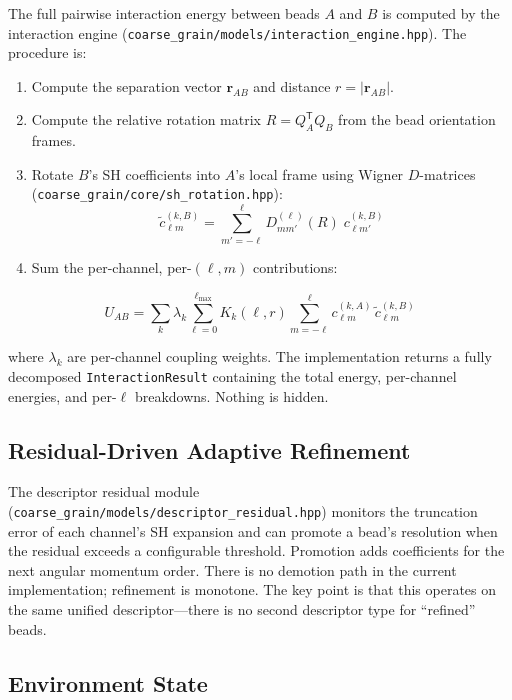 ﻿\documentclass[11pt]{article}
\newcommand{\file}[1]{\texttt{#1}}
\newcommand{\type}[1]{\texttt{#1}}
\begin{document}
The full pairwise interaction energy between beads $A$ and $B$ is computed by
the interaction engine (\file{coarse\_grain/models/interaction\_engine.hpp}).
The procedure is:

\begin{enumerate}
  \item Compute the separation vector $\mathbf{r}_{AB}$ and distance
        $r = |\mathbf{r}_{AB}|$.
  \item Compute the relative rotation matrix
        $R = Q_A^{\mathsf{T}} Q_B$ from the bead orientation frames.
  \item Rotate $B$'s SH coefficients into $A$'s local frame using Wigner
        $D$-matrices (\file{coarse\_grain/core/sh\_rotation.hpp}):
        \[
          \tilde{c}_{\ell m}^{(k,B)}
            = \sum_{m'=-\ell}^{\ell} D^{(\ell)}_{mm'}(R)\;
              c_{\ell m'}^{(k,B)}
        \]
  \item Sum the per-channel, per-$(\ell, m)$ contributions:
\end{enumerate}

\begin{equation}
\label{eq:interaction}
  U_{AB}
    = \sum_{k} \lambda_k \sum_{\ell=0}^{\ell_{\max}}
      K_k(\ell, r)
      \sum_{m=-\ell}^{\ell}
        c_{\ell m}^{(k,A)} \, \tilde{c}_{\ell m}^{(k,B)}
\end{equation}

where $\lambda_k$ are per-channel coupling weights. The implementation
returns a fully decomposed \type{InteractionResult} containing the total
energy, per-channel energies, and per-$\ell$ breakdowns. Nothing is hidden.

\subsection{Residual-Driven Adaptive Refinement}

The descriptor residual module
(\file{coarse\_grain/models/descriptor\_residual.hpp}) monitors the truncation
error of each channel's SH expansion and can promote a bead's resolution
when the residual exceeds a configurable threshold. Promotion adds
coefficients for the next angular momentum order. There is no demotion path
in the current implementation; refinement is monotone. The key point is that
this operates on the same unified descriptor---there is no second descriptor
type for ``refined'' beads.
\subsection{Environment State}
\end{document}
